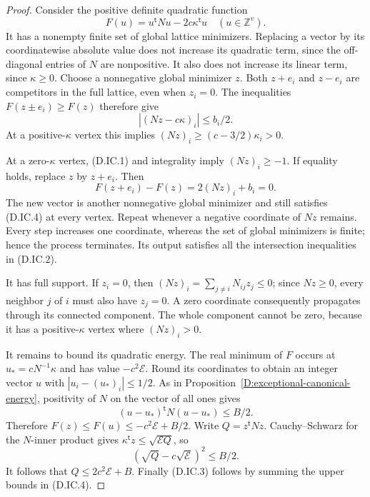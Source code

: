 \begin{proof}
Consider the positive definite quadratic function
\[
     F(u)=u^{\mathsf t}Nu-2c\kappa^{\mathsf t}u
     \quad (u\in\mathbb Z^v).
\]
It has a nonempty finite set of global lattice minimizers.
Replacing a vector by its coordinatewise absolute value does not
increase its quadratic term, since the off-diagonal entries of $N$
are nonpositive. It also does not increase its linear term, since
$\kappa\ge0$. Choose a nonnegative global minimizer $z$.
Both $z+e_i$ and $z-e_i$ are competitors in the full lattice,
even when $z_i=0$. The inequalities
$F(z\pm e_i)\ge F(z)$ therefore give
\[
               |(Nz-c\kappa)_i|\le b_i/2.             \tag{D.IC.4}
\]
At a positive-$\kappa$ vertex this implies
$(Nz)_i\ge(c-3/2)\kappa_i>0$.

At a zero-$\kappa$ vertex, (D.IC.1) and integrality imply
$(Nz)_i\ge-1$. If equality holds, replace $z$ by $z+e_i$.
Then
\[
       F(z+e_i)-F(z)=2(Nz)_i+b_i=0.
\]
The new vector is another nonnegative global minimizer and still
satisfies (D.IC.4) at every vertex. Repeat whenever a negative
coordinate of $Nz$ remains. Every step increases one coordinate,
whereas the set of global minimizers is finite; hence the process
terminates. Its output satisfies all the intersection inequalities
in (D.IC.2).

It has full support. If $z_i=0$, then
$(Nz)_i=\sum_{j\ne i}N_{ij}z_j\le0$; since $Nz\ge0$,
every neighbor $j$ of $i$ must also have $z_j=0$.
A zero coordinate consequently propagates through its connected
component. The whole component cannot be zero, because it has a
positive-$\kappa$ vertex where $(Nz)_i>0$.

It remains to bound its quadratic energy. The real minimum of $F$
occurs at $u_*=cN^{-1}\kappa$ and has value $-c^2\mathcal E$.
Round its coordinates to obtain an integer vector $u$ with
$|u_i-(u_*)_i|\le1/2$. As in
Proposition~\ref{D:exceptional-canonical-energy}, positivity of $N$
on the vector of all ones gives
\[
 (u-u_*)^{\mathsf t}N(u-u_*)\le B/2.
\]
Therefore $F(z)\le F(u)\le-c^2\mathcal E+B/2$.
Write $Q=z^{\mathsf t}Nz$. Cauchy--Schwarz for the $N$-inner
product gives $\kappa^{\mathsf t}z\le\sqrt{\mathcal E Q}$, so
\[
       (\sqrt Q-c\sqrt{\mathcal E})^2\le B/2.
\]
It follows that $Q\le2c^2\mathcal E+B$. Finally (D.IC.3) follows
by summing the upper bounds in (D.IC.4).
\end{proof}

